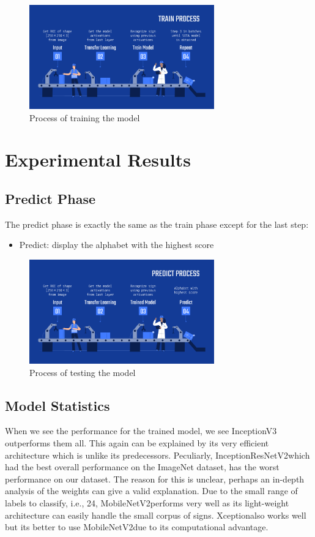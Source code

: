 \documentclass[twocolumn]{article}
\newcommand{\mobilenet}{MobileNetV2}
\newcommand{\xception}{Xception}
\newcommand{\inception}{InceptionV3}
\newcommand{\resnet}{InceptionResNetV2}
\begin{document}
\begin{figure}[h]
\centering
\includegraphics[width=8cm]{./figures/train process}
\caption{Process of training the model}
\end{figure}


\section{Experimental Results}

\subsection{Predict Phase}

The predict phase is exactly the same as the train phase except for the last 
step:
\begin{itemize}
  \item Predict: display the alphabet with the highest score
\end{itemize}

\begin{figure}[h]
\centering
\includegraphics[width=8cm]{./figures/predict process}
\caption{Process of testing the model}
\end{figure}

\subsection{Model Statistics}

When we see the performance for the trained model, we see \inception 
outperforms them all. This again can be explained by its very efficient 
architecture which is unlike its predecessors. Peculiarly, \resnet which had 
the best overall performance on the ImageNet dataset, has the worst 
performance on our dataset. The reason for this is unclear, perhaps an 
in-depth analysis of the weights can give a valid explanation. Due to the 
small range of labels to classify, i.e., 24, \mobilenet performs very well as 
its light-weight architecture can easily handle the small corpus of signs. 
\xception also works well but its better to use \mobilenet due to its 
computational advantage.
\end{document}
